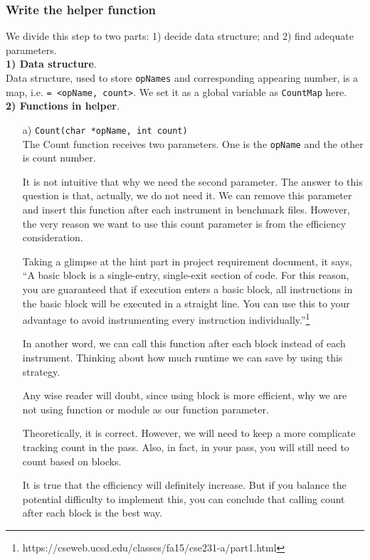 \documentclass{acm_proc_article-sp}
\begin{document}
\subsubsection{Write the helper function}
We divide this step to two parts: 1) decide data structure; and 2) find adequate parameters.\vspace{0.1in}\\
\textbf{1) Data structure}. \\
Data structure, used to store {\tt opNames} and corresponding appearing number, is a map, i.e. {\tt <key, value>= <opName, count>}. 
We set it as a global variable as {\tt CountMap} here.\vspace{0.1in}\\
\textbf{2) Functions in helper}. 
\begin{itemize}
\item[a)] {\tt Count(char *opName, int count)}\\
The Count function receives two parameters.  One is the {\tt opName} and the other is count number.

It is not intuitive that why we need the second parameter. The answer to this question is that, actually, we do not need it. We can remove this parameter and insert this function after each instrument in benchmark files. 
However, the very reason we want to use this count parameter is from the efficiency consideration.

Taking a glimpse at the hint part in project requirement document, it says, 
``A basic block is a single-entry, single-exit section of code. For this reason, you are guaranteed that if execution enters a basic block, all instructions in the basic block will be executed in a straight line. You can use this to your advantage to avoid instrumenting every instruction individually.''\footnote{\small https://cseweb.ucsd.edu/classes/fa15/cse231-a/part1.html}

In another word, we can call this function after each block instead of each instrument. Thinking about how much runtime we can save by using this strategy.

Any wise reader will doubt, since using block is more efficient, why we are not using function or module as our function parameter.

Theoretically, it is correct. However, we will need to keep a more complicate tracking count in the pass. Also, in fact, in your pass, you will still need to count based on blocks.

It is true that the efficiency will definitely increase. But if you balance the potential difficulty to implement this, you can conclude that calling count after each block is the best way.


\end{itemize}
\end{document}
